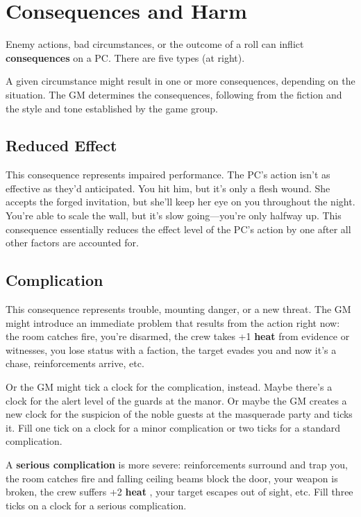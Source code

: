 \documentclass[11pt,oneside]{book}
\newcommand{\gameterm}[1]{\textbf{#1}}
\begin{document}
\chapter{Consequences and Harm}

Enemy actions, bad circumstances, or the outcome of a roll can inflict \textbf{consequences} on a PC. There are five types (at right).

A given circumstance might result in one or more consequences, depending on the situation. The GM determines the consequences, following from the fiction and the style and tone established by the game group.

\section{Reduced Effect}

This consequence represents impaired performance. The PC’s action isn’t as effective as they’d anticipated. You hit him, but it’s only a flesh wound. She accepts the forged invitation, but she’ll keep her eye on you throughout the night. You’re able to scale the wall, but it’s slow going---you’re only halfway up. This consequence essentially reduces the effect level of the PC’s action by one after all other factors are accounted for.

\section{Complication}

This consequence represents trouble, mounting danger, or a new threat. The GM might introduce an immediate problem that results from the action right now: the room catches fire, you’re disarmed, the crew takes +1 \gameterm{heat}  from evidence or witnesses, you lose status with a faction, the target evades you and now it’s a chase, reinforcements arrive, etc.

Or the GM might tick a clock for the complication, instead. Maybe there’s a clock for the alert level of the guards at the manor. Or maybe the GM creates a new clock for the suspicion of the noble guests at the masquerade party and ticks it. Fill one tick on a clock for a minor complication or two ticks for a standard complication.

A \textbf{serious complication} is more severe: reinforcements surround and trap you, the room catches fire and falling ceiling beams block the door, your weapon is broken, the crew suffers +2 \gameterm{heat} , your target escapes out of sight, etc. Fill three ticks on a clock for a serious complication.
\end{document}

